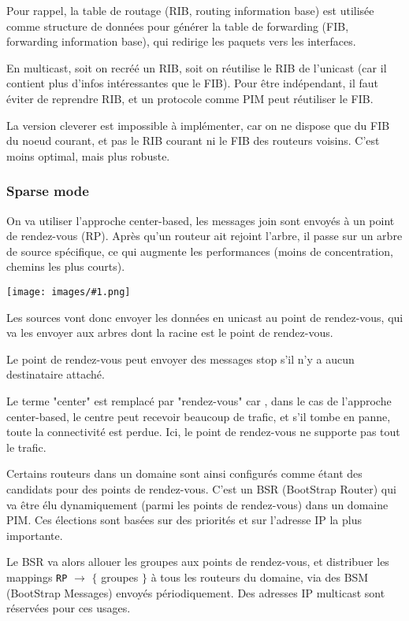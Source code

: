 \documentclass[10pt,a4paper]{report}
\newcommand{\dessin}[1]{\begin{center}\texttt{[image: images/\#1.png]}\end{center}}
\begin{document}
		Pour rappel, la table de routage (RIB, routing information base) est utilisée comme structure de données pour générer la table de forwarding (FIB, forwarding information base), qui redirige les paquets vers les interfaces.
		
		En multicast, soit on recréé un RIB, soit on réutilise le RIB de l'unicast (car il contient plus d'infos intéressantes que le FIB). Pour être indépendant, il faut éviter de reprendre RIB, et un protocole comme PIM peut réutiliser le FIB.
		
		La version cleverer est impossible à implémenter, car on ne dispose que du FIB du noeud courant, et pas le RIB courant ni le FIB des routeurs voisins. C'est moins optimal, mais plus robuste.
		
		
		\subsubsection{Sparse mode}
		
		On va utiliser l'approche center-based, les messages join sont envoyés à un point de rendez-vous (RP). Après qu'un routeur ait rejoint l'arbre, il passe sur un arbre de source spécifique, ce qui augmente les performances (moins de concentration, chemins les plus courts).
		
		\dessin{138}
		
		Les sources vont donc envoyer les données en unicast au point de rendez-vous, qui va les envoyer aux arbres dont la racine est le point de rendez-vous.
		
		Le point de rendez-vous peut envoyer des messages stop s'il n'y a aucun destinataire attaché.
		
		Le terme "center" est remplacé par "rendez-vous" car , dans le cas de l'approche center-based, le centre peut recevoir beaucoup de trafic, et s'il tombe en panne, toute la connectivité est perdue. Ici, le point de rendez-vous ne supporte pas tout le trafic.
		
		Certains routeurs dans un domaine sont ainsi configurés comme étant des candidats pour des points de rendez-vous. C'est un BSR (BootStrap Router) qui va être élu dynamiquement (parmi les points de rendez-vous) dans un domaine PIM. Ces élections sont basées sur des priorités et sur l'adresse IP la plus importante.
		
		Le BSR va alors allouer les groupes aux points de rendez-vous, et distribuer les mappings \texttt{RP} $\rightarrow$ $\lbrace$ groupes $\rbrace$ à tous les routeurs du domaine, via des BSM (BootStrap Messages) envoyés périodiquement. Des adresses IP multicast sont réservées pour ces usages.
		
\end{document}

